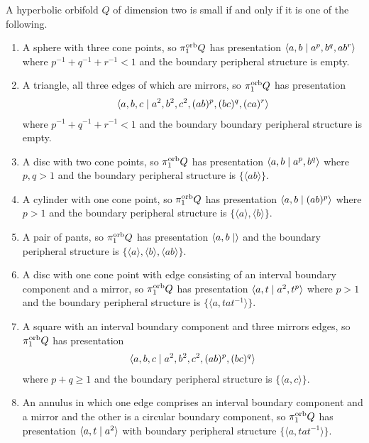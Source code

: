 \begin{proposition}\cite[Proposition 5.12]{guirardellevitt17}\label{prop:characterisationofsmall}
  A hyperbolic orbifold $Q$ of dimension two is small if and only if it is one of the following. 
\begin{enumerate}
 \item A sphere with three cone points, so $\pi_1^{\mathrm{orb}} Q$ has presentation $\langle a, b \mid a^p, b^q, ab^r\rangle$ where $p^{-1}+q^{-1}+r^{-1} < 1$ and the boundary peripheral structure is empty.
 \item A triangle, all three edges of which are mirrors, so $\pi_1^{\mathrm{orb}} Q$ has presentation 
   \begin{align*} 
     \langle a, b, c \mid a^2, b^2, c^2, (ab)^p, (bc)^q, (ca)^r\rangle
   \end{align*}
   where $p^{-1}+q^{-1}+r^{-1} < 1$ and the boundary boundary peripheral structure is empty.
 \item A disc with two cone points, so $\pi_1^{\mathrm{orb}} Q$ has presentation $\langle a, b \mid a^p, b^q\rangle$ where $p, q > 1$ and the boundary peripheral structure is $\{\langle ab\rangle\}$.
 \item A cylinder with one cone point, so $\pi_1^{\mathrm{orb}} Q$ has presentation $\langle a, b \mid (ab)^p\rangle$ where $p >1$ and the boundary peripheral structure is $\{\langle a\rangle, \langle b\rangle\}$.
 \item A pair of pants, so $\pi_1^{\mathrm{orb}} Q$ has presentation $\langle a, b \mid \rangle$ and the boundary peripheral structure is $\{\langle a\rangle, \langle b\rangle, \langle ab\rangle\}$.
 \item A disc with one cone point with edge consisting of an interval boundary component and a mirror, so $\pi_1^{\mathrm{orb}} Q$ has presentation $\langle a, t \mid a^2, t^p\rangle$ where $p > 1$ and the boundary peripheral structure is $\{\langle a, tat^{-1}\rangle\}$.
 \item A square with an interval boundary component and three mirrors edges, so $\pi_1^{\mathrm{orb}} Q$ has presentation 
   \begin{align*} 
     \langle a, b, c \mid a^2, b^2, c^2, (ab)^p, (bc)^q\rangle
   \end{align*}
   where $p + q \geq 1$ and the boundary peripheral structure is $\{\langle a, c\rangle\}$.
 \item An annulus in which one edge comprises an interval boundary component and a mirror and the other is a circular boundary component, so $\pi_1^{\mathrm{orb}} Q$ has presentation $\langle a, t \mid a^2\rangle$ with boundary peripheral structure $\{\langle a, tat^{-1}\rangle\}$.

\end{enumerate}
\end{proposition}

